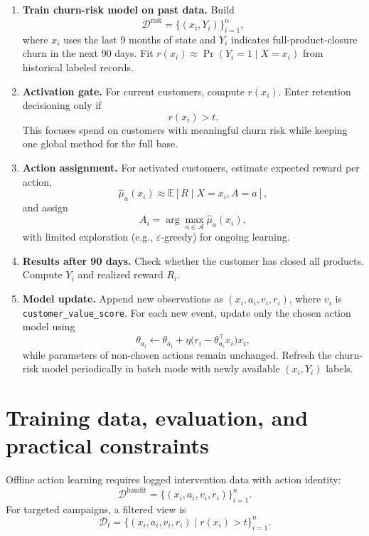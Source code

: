 \documentclass[11pt,a4paper]{article}
\begin{document}
\begin{enumerate}
    \item[\textbf{0)}] \textbf{Train churn-risk model on past data.} Build
    \[
    \mathcal{D}^{\text{risk}}=\{(x_i,Y_i)\}_{i=1}^n,
    \]
    where $x_i$ uses the last 9 months of state and $Y_i$ indicates full-product-closure churn in the next 90 days. Fit $r(x_i)\approx \Pr(Y_i=1\mid X=x_i)$ from historical labeled records.

    \item[\textbf{1)}] \textbf{Activation gate.} For current customers, compute $r(x_i)$. Enter retention decisioning only if
    \[
    r(x_i)>t.
    \]
    This focuses spend on customers with meaningful churn risk while keeping one global method for the full base.

    \item[\textbf{2)}] \textbf{Action assignment.} For activated customers, estimate expected reward per action,
    \[
    \widehat{\mu}_a(x_i)\approx \mathbb{E}[R\mid X=x_i,A=a],
    \]
    and assign
    \[
    A_i=\arg\max_{a\in\mathcal{A}}\widehat{\mu}_a(x_i),
    \]
    with limited exploration (e.g., $\varepsilon$-greedy) for ongoing learning.

    \item[\textbf{3)}] \textbf{Results after 90 days.} Check whether the customer has closed all products. Compute $Y_i$ and realized reward $R_i$.

    \item[\textbf{4)}] \textbf{Model update.} Append new observations as \((x_i,a_i,v_i,r_i)\), where $v_i$ is \texttt{customer\_value\_score}. For each new event, update only the chosen action model using
    \[
    \theta_{a_i}\leftarrow \theta_{a_i}+\eta\big(r_i-\theta_{a_i}^\top x_i\big)x_i,
    \]
    while parameters of non-chosen actions remain unchanged. Refresh the churn-risk model periodically in batch mode with newly available \((x_i,Y_i)\) labels.
\end{enumerate}

\section{Training data, evaluation, and practical constraints}
Offline action learning requires logged intervention data with action identity:
\[
\mathcal{D}^{\text{bandit}}=\{(x_i,a_i,v_i,r_i)\}_{i=1}^n.
\]
For targeted campaigns, a filtered view is
\[
\mathcal{D}_t=\{(x_i,a_i,v_i,r_i)\mid r(x_i)>t\}_{i=1}^n.
\]
\end{document}
